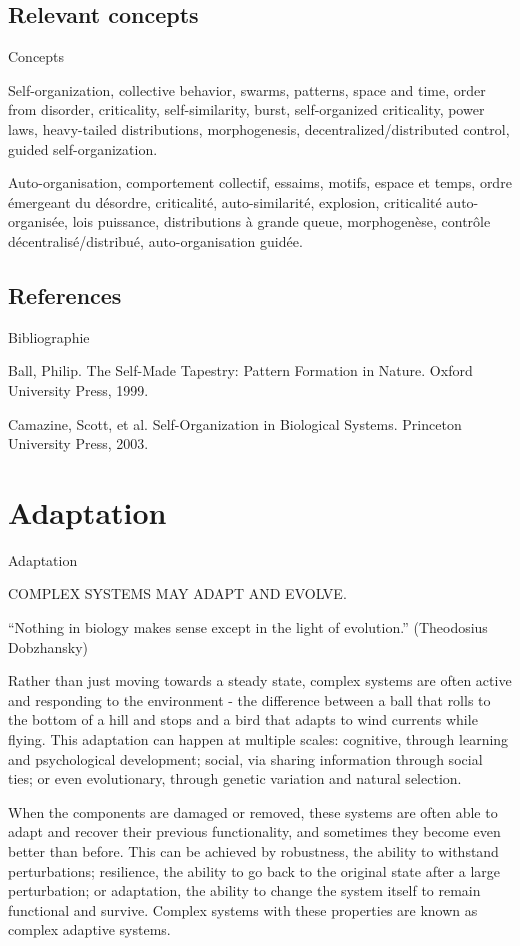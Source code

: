 \documentclass[12pt]{article}
\begin{document}
\subsection*{Relevant concepts}{Concepts}


Self-organization, collective behavior, swarms, patterns, space and time, order from disorder, criticality, self-similarity, burst, self-organized criticality, power laws, heavy-tailed distributions, morphogenesis, decentralized/distributed control, guided self-organization.

Auto-organisation, comportement collectif, essaims, motifs, espace et temps, ordre émergeant du désordre, criticalité, auto-similarité, explosion, criticalité auto-organisée, lois puissance, distributions à grande queue, morphogenèse, contrôle décentralisé/distribué, auto-organisation guidée.


\subsection*{References}{Bibliographie}

Ball, Philip. The Self-Made Tapestry: Pattern Formation in Nature. Oxford University Press, 1999.

Camazine, Scott, et al. Self-Organization in Biological Systems. Princeton University Press, 2003.


\section{Adaptation}{Adaptation}

COMPLEX SYSTEMS MAY ADAPT AND EVOLVE.

	
	
``Nothing in biology makes sense except in the light of evolution.'' (Theodosius Dobzhansky)


Rather than just moving towards a steady state, complex systems are often active and responding to the environment - the difference between a ball that rolls to the bottom of a hill and stops and a bird that adapts to wind currents while flying. This adaptation can happen at multiple scales: cognitive, through learning and psychological development; social, via sharing information through social ties; or even evolutionary, through genetic variation and natural selection.

When the components are damaged or removed, these systems are often able to adapt and recover their previous functionality, and sometimes they become even better than before. This can be achieved by robustness, the ability to withstand perturbations; resilience, the ability to go back to the original state after a large perturbation; or adaptation, the ability to change the system itself to remain functional and survive. Complex systems with these properties are known as complex adaptive systems.
\end{document}
